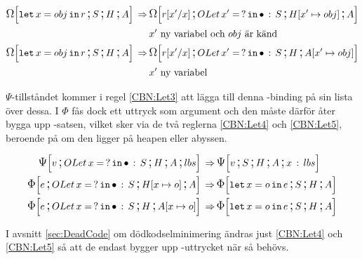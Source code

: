 \documentclass[../Optimise]{subfiles}
\begin{document}
\begin{align}
\label{CBN:Let1} \CBNOMEGA SHA{\eLet x{obj}r} \rulesep & \CBNOMEGA {\cOLet{x'}S}{\heap{x'}{obj}}A{\subst r{x'}x}\\
   & x'\mbox{ ny variabel och } obj \text{ är känd}\nonumber \\
\label{CBN:Let2} \CBNOMEGA SHA{\eLet x{obj}r} \rulesep & \CBNOMEGA{\cOLet{x'}S}H{\abyss{x'}{obj}}{\subst r{x'}x}\\
   & x'\mbox{ ny variabel} \nonumber 
\end{align}

$\Psi$-tillståndet kommer i regel \eqref{CBN:Let3} att lägga till denna -binding
på sin lista över dessa.
 I $\Phi$ fås dock ett uttryck som argument och den måste därför 
åter bygga upp -satsen, vilket sker via de två reglerna \eqref{CBN:Let4} och 
\eqref{CBN:Let5}, beroende på om den ligger på heapen eller abyssen.

\begin{align}
\label{CBN:Let3} \CBNPSI{\cOLet xS}H A{lbs}v \rulesep & \CBNPSI SHA{x\,:\, lbs}v \\
\label{CBN:Let4} \CBNIRR{\cOLet xS}{\heap xo}Ae \rulesep & \CBNIRR SHA{\eLet xoe} \\
\label{CBN:Let5} \CBNIRR{\cOLet xS}H{\abyss xo}e \rulesep & \CBNIRR SHA{\eLet xoe}
\end{align}


I avsnitt \ref{sec:DeadCode} om dödkodselminimering ändras just \eqref{CBN:Let4} 
och \eqref{CBN:Let5} så att de endast bygger upp -uttrycket när så behövs.


\end{document}
